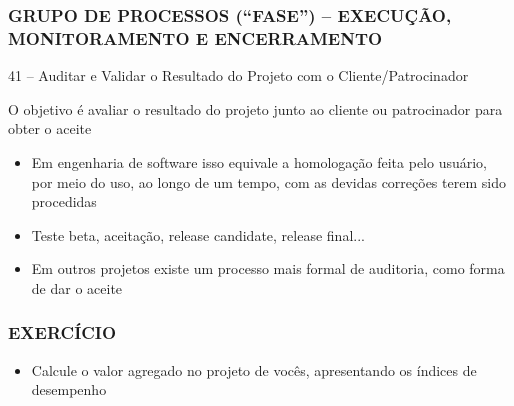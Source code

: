 \begin{frame}
 \frametitle{GRUPO DE PROCESSOS (“FASE”) – \small{EXECUÇÃO, MONITORAMENTO E ENCERRAMENTO}}
 41 – Auditar e Validar o Resultado do Projeto com o Cliente/Patrocinador
 \begin{block}{}
  O objetivo é avaliar o resultado do projeto junto ao cliente ou patrocinador para obter o aceite
 \end{block}
  \begin{itemize}
   \item Em engenharia de software isso equivale a homologação feita pelo usuário, por meio do uso, ao longo de um tempo, com as devidas correções terem sido procedidas
    \item Teste beta, aceitação, release candidate, release final...
    \item Em outros projetos existe um processo mais formal de auditoria, como forma de dar o aceite
  \end{itemize}
\end{frame}


\begin{frame}
 \frametitle{EXERCÍCIO}
  \begin{itemize}
   \item Calcule o valor agregado no projeto de vocês, apresentando os índices de desempenho
  \end{itemize}
\end{frame}
